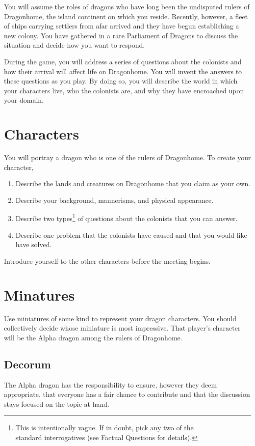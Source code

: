 \documentclass[a6paper, 11pt, parskip=half, DIV=15]{scrartcl}
\begin{document}
You will assume the roles of dragons who have long been the undisputed rulers of Dragonhome, the island continent on which you reside. Recently, however, a fleet of ships carrying settlers from afar arrived and they have begun establishing a new colony. You have gathered in a rare Parliament of Dragons to discuss the situation and decide how you want to respond.

During the game, you will address a series of questions about the colonists and how their arrival will affect life on Dragonhome. You will invent the answers to these questions as you play. By doing so, you will describe the world in which your characters live, who the colonists are, and why they have encroached upon your domain.


\newpage
\enlargethispage{1.75\baselineskip}
\section*{Characters}
You will portray a dragon who is one of the rulers of Dragonhome. To create your character,
\begin{enumerate}[nosep]
	\item Describe the lands and creatures on Dragonhome that you claim as your own.
	\item Describe your background, mannerisms, and physical appearance.
	\item Describe two types\footnote[1]{This is intentionally vague. If in doubt, pick any two of the\\standard interrogatives (see {\setmainfont{Cinzel-Bold}\scriptsize Factual Questions} for details).} of questions about the colonists that you can answer.
	\item Describe one problem that the colonists have caused and that you would like have solved.
\end{enumerate}
Introduce yourself to the other characters before the meeting begins.

\section*{Minatures}
Use miniatures of some kind to represent your dragon characters. You should collectively decide whose miniature is most impressive. That player's character will be the Alpha dragon among the rulers of Dragonhome. 

\newpage
\enlargethispage{1.75\baselineskip}
\subsection*{Decorum}
The Alpha dragon has the responsibility to ensure, however they deem appropriate, that everyone has a fair chance to contribute and that the discussion stays focused on the topic at hand. %
\end{document}
